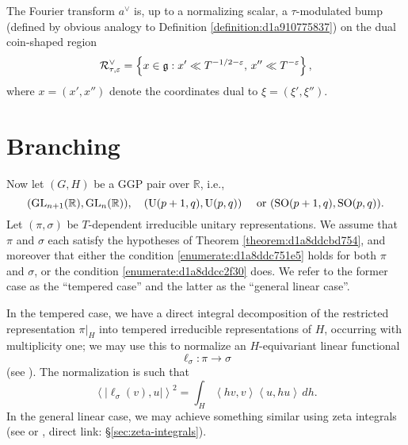\documentclass[reqno]{amsart} 
\numberwithin{equation}{section}
\begin{document}
\begin{remark}
  The Fourier transform $a^\vee$ is, up to a normalizing scalar, a $\tau$-modulated bump (defined by obvious analogy to Definition \ref{definition:d1a910775837}) on the dual coin-shaped region
  \begin{equation*}
    \mathcal{R}_{\tau,\varepsilon}^\vee = \left\{ x \in \mathfrak{g} : x ' \ll T^{-1/2-\varepsilon}, \, x '' \ll T^{-\varepsilon} \right\},
  \end{equation*}
  where $x = (x', x'')$ denote the coordinates dual to $\xi = (\xi ', \xi '')$.
\end{remark}

\section{Branching}\label{sec:d1a8de615a31}
Now let $(G,H)$ be a GGP pair over $\mathbb{R}$, i.e.,
\begin{equation*}
  (\operatorname{GL}_{n+1}(\mathbb{R}), \operatorname{GL}_n(\mathbb{R})),
  \quad
  (\operatorname{U}(p+1,q), \operatorname{U}(p,q))
  \quad
  \text{ or } 
  (\operatorname{SO}(p+1,q), \operatorname{SO}(p,q)).
\end{equation*}
Let $(\pi,\sigma)$ be $T$-dependent irreducible unitary representations.  We assume that $\pi$ and $\sigma$ each satisfy the hypotheses of Theorem \ref{theorem:d1a8ddcbd754}, and moreover that either the condition \eqref{enumerate:d1a8ddc751e5} holds for both $\pi$ and $\sigma$, or the condition \eqref{enumerate:d1a8ddcc2f30} does.  We refer to the former case as the ``tempered case'' and the latter as the ``general linear case''.

In the tempered case, we have a direct integral decomposition of the restricted representation $\pi|_{H}$ into tempered irreducible representations of $H$, occurring with multiplicity one; we may use this to normalize an $H$-equivariant linear functional
\begin{equation*}
  \ell_\sigma : \pi \rightarrow \sigma
\end{equation*}
(see \cite[\S18]{nelson-venkatesh-1}).  The normalization is such that
\begin{equation}\label{eqn:d1a8de462057}
  \left\langle \left\lvert \ell_\sigma(v), u \right\rvert \right\rangle^2
  = \int_{H} \left\langle h v, v \right\rangle \left\langle u , h u  \right\rangle \, d h.
\end{equation}
In the general linear case, we may achieve something similar using zeta integrals (see \cite{MR701565} or \cite[\S2.14.4]{2021arXiv210915230N}, direct link: \S\ref{sec:zeta-integrals}).
\end{document}
